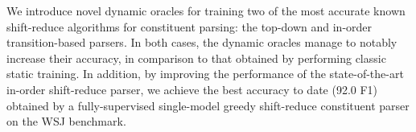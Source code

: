 We introduce novel dynamic oracles for training two of the most accurate known shift-reduce algorithms for constituent parsing: the top-down and in-order transition-based parsers. In both cases, the dynamic oracles manage to notably increase their accuracy, in comparison to that obtained by performing classic static training. In addition, by improving the performance of the state-of-the-art in-order shift-reduce parser, we achieve the best accuracy to date (92.0 F1) obtained by a fully-supervised single-model greedy shift-reduce constituent parser on the WSJ benchmark.
